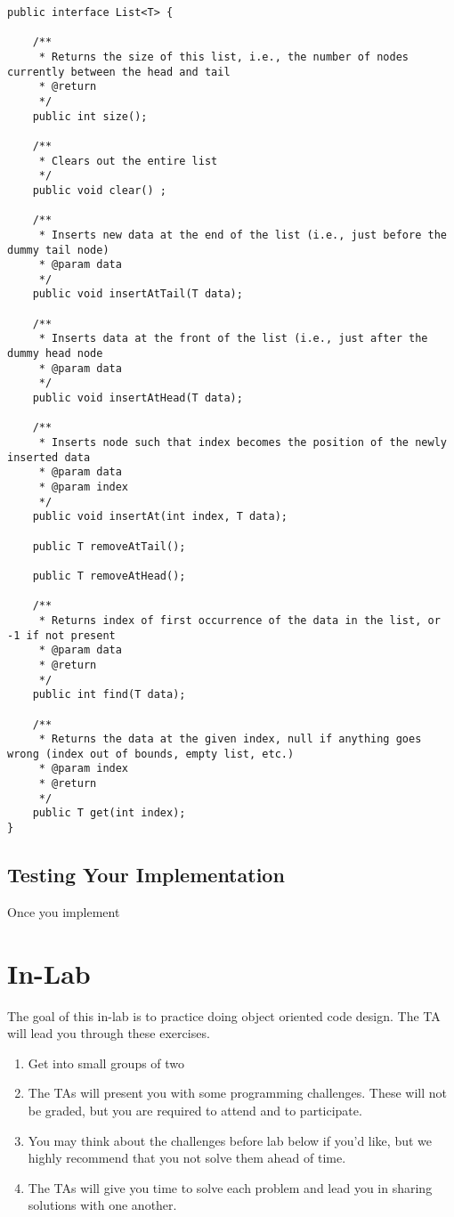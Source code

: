 \documentclass[paper=a4, fontsize=11pt, parskip=full]{scrartcl} %
\numberwithin{equation}{section} %
\numberwithin{figure}{section} %
\numberwithin{table}{section} %
\begin{document}
\begin{lstlisting}
public interface List<T> {
	
	/**
	 * Returns the size of this list, i.e., the number of nodes currently between the head and tail
	 * @return
	 */
	public int size();
	
	/**
	 * Clears out the entire list
	 */
	public void clear() ;
	
	/**
	 * Inserts new data at the end of the list (i.e., just before the dummy tail node)
	 * @param data
	 */
	public void insertAtTail(T data);
	
	/**
	 * Inserts data at the front of the list (i.e., just after the dummy head node
	 * @param data
	 */
	public void insertAtHead(T data);
	
	/**
	 * Inserts node such that index becomes the position of the newly inserted data
	 * @param data
	 * @param index
	 */
	public void insertAt(int index, T data);
	
	public T removeAtTail();
	
	public T removeAtHead();
	
	/**
	 * Returns index of first occurrence of the data in the list, or -1 if not present
	 * @param data
	 * @return
	 */
	public int find(T data);
	
	/**
	 * Returns the data at the given index, null if anything goes wrong (index out of bounds, empty list, etc.)
	 * @param index
	 * @return
	 */
	public T get(int index);
}
\end{lstlisting}

\subsection{Testing Your Implementation}

Once you implement 



\newpage
\section{In-Lab}

The goal of this in-lab is to practice doing object oriented code design. The TA will lead you through these exercises.

\begin{enumerate}
	\item Get into small groups of two
	\item The TAs will present you with some programming challenges. These will not be graded, but you are required to attend and to participate.
	\item You may think about the challenges before lab below if you'd like, but we highly recommend that you not solve them ahead of time.
	\item The TAs will give you time to solve each problem and lead you in sharing solutions with one another.
\end{enumerate}
\end{document}
